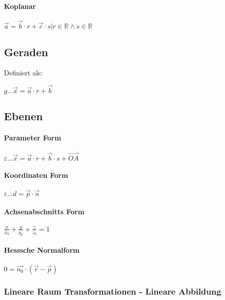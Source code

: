 \documentclass[12pt]{article}
\begin{document}
\paragraph*{Koplanar} \( \overrightarrow{a} = \overrightarrow{b} \cdot r + \overrightarrow{c} \cdot s \vert r \in \mathbb{R} \land s \in \mathbb{R} \)

\subsection*{ Geraden }
Definiert als:

\( g \dots \overrightarrow{x} = \overrightarrow{a} \cdot r + \overrightarrow{b} \)

\subsection*{ Ebenen}

\paragraph*{Parameter Form } \( \varepsilon ... \overrightarrow{x} = \overrightarrow{a} \cdot r + \overrightarrow{b} \cdot s + \overrightarrow{OA} \)

\paragraph*{Koordinaten Form} \( \varepsilon ... d = \overrightarrow{p } \cdot \overrightarrow{n} \)

\paragraph*{Achsenabschnitts Form} \( \frac{x}{x_0} + \frac{y}{y_0} + \frac{z}{z_0} = 1 \)

\paragraph*{ Hesssche Normalform} \( 0 = \overrightarrow{n_0} \cdot( \overrightarrow{r} - \overrightarrow{p}) \)



\subsubsection*{ Lineare Raum Transformationen - Lineare Abbildung}
\end{document}
